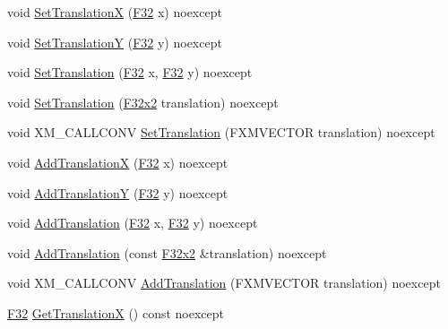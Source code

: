 \begin{DoxyCompactItemize}
\item 
void \hyperlink{classmage_1_1_sprite_transform_aa30ede51f36c31b5a35ebe7b60545e1c}{Set\+TranslationX} (\hyperlink{namespacemage_aa97e833b45f06d60a0a9c4fc22ae02c0}{F32} x) noexcept
\item 
void \hyperlink{classmage_1_1_sprite_transform_a3086df30d1ed6813db07bc78ef47df6c}{Set\+TranslationY} (\hyperlink{namespacemage_aa97e833b45f06d60a0a9c4fc22ae02c0}{F32} y) noexcept
\item 
void \hyperlink{classmage_1_1_sprite_transform_a9fb2d4e0f332c316c8f2d07f482f40a5}{Set\+Translation} (\hyperlink{namespacemage_aa97e833b45f06d60a0a9c4fc22ae02c0}{F32} x, \hyperlink{namespacemage_aa97e833b45f06d60a0a9c4fc22ae02c0}{F32} y) noexcept
\item 
void \hyperlink{classmage_1_1_sprite_transform_adc47b798331d5e61d158fb4f00d37084}{Set\+Translation} (\hyperlink{namespacemage_aa87237ad091f5cd7da612b8523fc108f}{F32x2} translation) noexcept
\item 
void X\+M\+\_\+\+C\+A\+L\+L\+C\+O\+NV \hyperlink{classmage_1_1_sprite_transform_a597ef325d25183a969915be48d0a99f7}{Set\+Translation} (F\+X\+M\+V\+E\+C\+T\+OR translation) noexcept
\item 
void \hyperlink{classmage_1_1_sprite_transform_a040bd05b911dbe199c3eab6f6811ce5b}{Add\+TranslationX} (\hyperlink{namespacemage_aa97e833b45f06d60a0a9c4fc22ae02c0}{F32} x) noexcept
\item 
void \hyperlink{classmage_1_1_sprite_transform_ab45b391a7bdc357facd0eb322e0a294f}{Add\+TranslationY} (\hyperlink{namespacemage_aa97e833b45f06d60a0a9c4fc22ae02c0}{F32} y) noexcept
\item 
void \hyperlink{classmage_1_1_sprite_transform_a567a3bd6476151f65d8ca62f818bba45}{Add\+Translation} (\hyperlink{namespacemage_aa97e833b45f06d60a0a9c4fc22ae02c0}{F32} x, \hyperlink{namespacemage_aa97e833b45f06d60a0a9c4fc22ae02c0}{F32} y) noexcept
\item 
void \hyperlink{classmage_1_1_sprite_transform_a3254ef538066d0005f4168a40f23300d}{Add\+Translation} (const \hyperlink{namespacemage_aa87237ad091f5cd7da612b8523fc108f}{F32x2} \&translation) noexcept
\item 
void X\+M\+\_\+\+C\+A\+L\+L\+C\+O\+NV \hyperlink{classmage_1_1_sprite_transform_a38ce964e75aca33eac312a995d142495}{Add\+Translation} (F\+X\+M\+V\+E\+C\+T\+OR translation) noexcept
\item 
\hyperlink{namespacemage_aa97e833b45f06d60a0a9c4fc22ae02c0}{F32} \hyperlink{classmage_1_1_sprite_transform_a27f93a491eed09c33f1ac547df011867}{Get\+TranslationX} () const noexcept

\end{DoxyCompactItemize}
